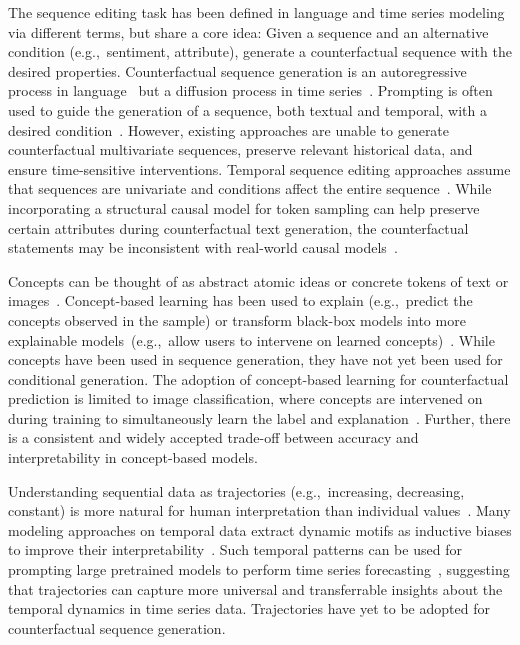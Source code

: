 


 The sequence editing task has been defined in language and time series modeling via different terms, but share a core idea: Given a sequence and an alternative condition (e.g.,~sentiment, attribute), generate a counterfactual sequence with the desired properties. Counterfactual sequence generation is an autoregressive process in language~\cite{chatzi2024counterfactual} but a diffusion process in time series~\cite{jing2024towards, bao2024towards}. Prompting is often used to guide the generation of a sequence, both textual and temporal, with a desired condition~\cite{zhang2023survey, bhattacharjee2024zero, jing2024towards, bao2024towards}. However, existing approaches are unable to generate counterfactual multivariate sequences, preserve relevant historical data, and ensure time-sensitive interventions. Temporal sequence editing approaches assume that sequences are univariate and conditions affect the entire sequence~\cite{jing2024towards, bao2024towards}. While incorporating a structural causal model for token sampling can help preserve certain attributes during counterfactual text generation, the counterfactual statements may be inconsistent with real-world causal models~\cite{chatzi2024counterfactual}.


 Concepts can be thought of as abstract atomic ideas or concrete tokens of text or images~\cite{the2024large, lai2023faithful}. Concept-based learning has been used to explain (e.g.,~predict the concepts observed in the sample) or transform black-box models into more explainable models~(e.g.,~allow users to intervene on learned concepts)~\cite{koh2020concept, shin2023closer, ismail2023concept, lai2023faithful, laguna2024beyond, van2024enforcing}. While concepts have been used in sequence generation, they have not yet been used for conditional generation. The adoption of concept-based learning for counterfactual prediction is limited to image classification, where concepts are intervened on during training to simultaneously learn the label and explanation~\cite{dominici2024climbing}. Further, there is a consistent and widely accepted trade-off between accuracy and interpretability in concept-based models.


 Understanding sequential data as trajectories (e.g.,~increasing, decreasing, constant) is more natural for human interpretation than individual values~\cite{kacprzyk2024towards}. Many modeling approaches on temporal data extract dynamic motifs as inductive biases to improve their interpretability~\cite{kacprzyk2024towards, goswami2024moment, cao2024tempo}.  Such temporal patterns can be used for prompting large pretrained models to perform time series forecasting~\cite{cao2024tempo}, suggesting that trajectories can capture more universal and transferrable insights about the temporal dynamics in time series data. Trajectories have yet to be adopted for counterfactual sequence generation.




